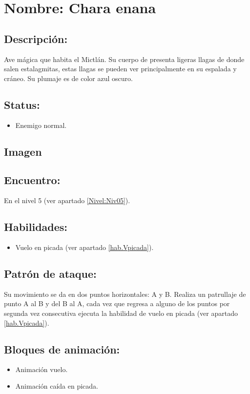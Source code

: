 \section{Nombre: Chara enana}   \label{per:chara}
\subsection{Descripción:}
Ave mágica que habita el Mictlán. Su cuerpo de presenta ligeras llagas de donde salen estalagmitas, estas llagas se pueden ver principalmente en su espalada y cráneo. Su plumaje es de color azul oscuro. 
\subsection{Status:}
\begin{itemize}
	\item Enemigo normal.
\end{itemize}
\subsection{Imagen}

\subsection{Encuentro:}
En el nivel 5 (ver apartado \ref{Nivel:Niv05}).
\subsection{Habilidades:}
\begin{itemize}
	\item Vuelo en picada (ver apartado \ref{hab.Vpicada}).
\end{itemize}
\subsection{Patrón de ataque:}
Su movimiento se da en dos puntos horizontales: A y B. Realiza un patrullaje de punto A al B y del B al A, cada vez que regresa a alguno de los puntos por segunda vez consecutiva ejecuta la habilidad de vuelo en picada (ver apartado \ref{hab.Vpicada}).
\subsection{Bloques de animación:}
	\begin{itemize}
		\item Animación vuelo.
		\item Animación caída en picada.
	\end{itemize}